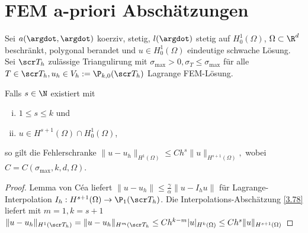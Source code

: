 \section{FEM a-priori Abschätzungen}

\begin{st} \label{3.82}
	Sei $a(\argdot, \argdot)$ koerziv, stetig, $l(\argdot)$ stetig auf $H_0^1(\Omega)$, $\Omega \subset \R^d$ beschränkt, polygonal berandet und $u \in H_0^1(\Omega)$ eindeutige schwache Lösung.
	Sei $\scr T_h$ zulässige Triangulirung mit $\sigma_{\text{max}} > 0, \sigma_T \le \sigma_{\text{max}}$ für alle $T \in \scr T_h, u_h \in V_h := \P_{k,0}(\scr T_h)$ Lagrange FEM-Lösung.

	Falls $s \in \N$ existiert mit
	\begin{enumerate}[i)]
		\item
			$1 \le s \le k$ und
		\item
			$u \in H^{s+1}(\Omega) \cap H_0^1(\Omega)$,
	\end{enumerate}
	so gilt die Fehlerschranke
	\begin{math}
		\|u - u_h\|_{H^1(\Omega)}
		\le C h^s \|u\|_{H^{s+1}(\Omega)},
	\end{math}
	wobei $C = C(\sigma_{\text{max}}, k, d, \Omega)$.
	\begin{proof}
		Lemma von Céa liefert
		\begin{math}
			\|u - u_h\| \le \frac{\gamma}{\alpha} \|u - I_hu\|
		\end{math}
		für Lagrange-Interpolation $I_h: H^{s+1}(\Omega) \to \P_1(\scr T_h)$.
		Die Interpolations-Abschätzung \ref{3.78} liefert mit $m = 1, k = s + 1$
		\begin{math}
			\|u - u_h\|_{H^1(\scr T_h)}
			= \|u - u_h\|_{H^m(\scr T_h}
			\le C h^{k-m} |u|_{H^k(\Omega)}
			\le C h^s \|u\|_{H^{s+1}(\Omega)}
		\end{math}
	\end{proof}
\end{st}

